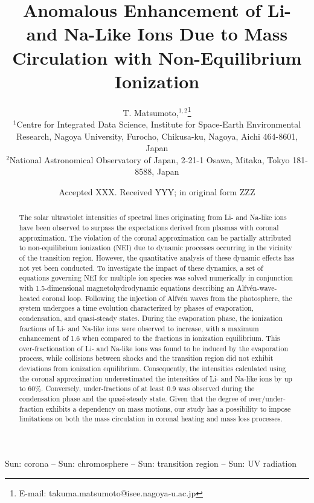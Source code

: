 \documentclass[fleqn,usenatbib]{mnras}
\title[Anomalous Ion Enhancement]{Anomalous Enhancement of Li- and Na-Like Ions Due to Mass Circulation with Non-Equilibrium Ionization}
\author[T.Matsumoto et al.]{
T. Matsumoto,$^{1,2}$\thanks{E-mail: takuma.matsumoto@isee.nagoya-u.ac.jp}
\\
$^{1}$Centre for Integrated Data Science, Institute for Space-Earth Environmental Research, Nagoya University, Furocho, Chikusa-ku, Nagoya, Aichi 464-8601, Japan\\
$^{2}$National Astronomical Observatory of Japan, 2-21-1 Osawa, Mitaka, Tokyo 181-8588, Japan
}
\date{Accepted XXX. Received YYY; in original form ZZZ}
\begin{document}
\label{firstpage}
\pagerange{\pageref{firstpage}--\pageref{lastpage}}
\maketitle

\begin{abstract}
The solar ultraviolet intensities of spectral lines originating from Li- and Na-like ions have been observed to surpass the expectations derived from plasmas with coronal approximation. 
The violation of the coronal approximation can be partially attributed to non-equilibrium ionization (NEI) due to dynamic processes occurring in the vicinity of the transition region.
However, the quantitative analysis of these dynamic effects has not yet been conducted.
To investigate the impact of these dynamics, a set of equations governing NEI for multiple ion species was solved numerically in conjunction with 1.5-dimensional magnetohydrodynamic equations describing an Alfv\'{e}n-wave-heated coronal loop. 
Following the injection of Alfv\'{e}n waves from the photosphere, the system undergoes a time evolution characterized by phases of evaporation, condensation, and quasi-steady states.
During the evaporation phase, the ionization fractions of Li- and Na-like ions were observed to increase, with a maximum enhancement of 1.6 when compared to the fractions in ionization equilibrium. 
This over-fractionation of Li- and Na-like ions was found to be induced by the evaporation process, while collisions between shocks and the transition region did not exhibit deviations from ionization equilibrium. Consequently, the intensities calculated using the coronal approximation underestimated the intensities of Li- and Na-like ions by up to 60\%.
Conversely, under-fractions of at least 0.9 was observed during the condensation phase and the quasi-steady state.
Given that the degree of over/under-fraction exhibits a dependency on mass motions, our study has a possibility to impose limitations on both the mass circulation in coronal heating and mass loss processes.


\end{abstract}

\begin{keywords}
Sun: corona -- Sun: chromosphere -- Sun: transition region -- Sun: UV radiation 
\end{keywords}
\end{document}

